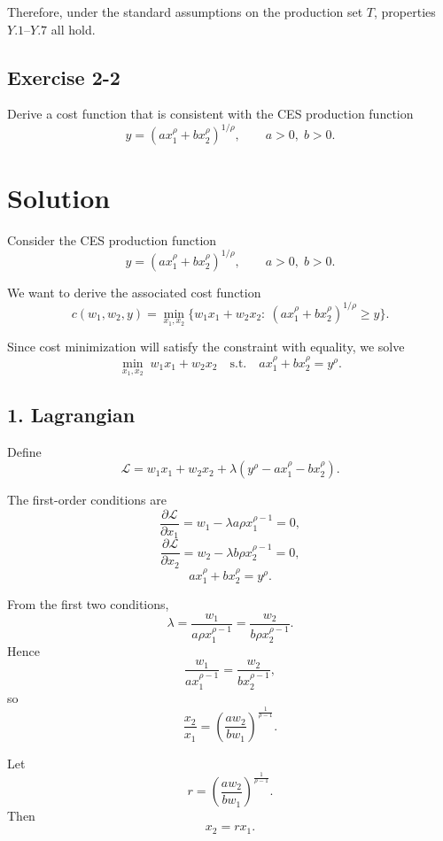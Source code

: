 Therefore, under the standard assumptions on the production set \(T\), properties \(Y.1\)--\(Y.7\) all hold.



\vspace{30pt}
\begin{tcolorbox}[breakable]

\subsection*{Exercise 2-2}

Derive a cost function that is consistent with the CES production function
\[
y = \left(a x_1^{\rho} + b x_2^{\rho}\right)^{1/\rho},
\qquad a>0,\; b>0.
\]

\end{tcolorbox}


\section*{Solution}

Consider the CES production function
\[
y=\left(a x_1^{\rho}+b x_2^{\rho}\right)^{1/\rho},
\qquad a>0,\; b>0.
\]

We want to derive the associated cost function
\[
c(w_1,w_2,y)=\min_{x_1,x_2}\{w_1x_1+w_2x_2:\ (a x_1^\rho+b x_2^\rho)^{1/\rho}\ge y\}.
\]

Since cost minimization will satisfy the constraint with equality, we solve
\[
\min_{x_1,x_2}\; w_1x_1+w_2x_2
\quad \text{s.t.} \quad
a x_1^\rho+b x_2^\rho=y^\rho.
\]

\subsection*{1. Lagrangian}

Define
\[
\mathcal L=w_1x_1+w_2x_2+\lambda\left(y^\rho-a x_1^\rho-b x_2^\rho\right).
\]

The first-order conditions are
\[
\frac{\partial \mathcal L}{\partial x_1}
=
w_1-\lambda a\rho x_1^{\rho-1}=0,
\]
\[
\frac{\partial \mathcal L}{\partial x_2}
=
w_2-\lambda b\rho x_2^{\rho-1}=0,
\]
\[
a x_1^\rho+b x_2^\rho=y^\rho.
\]

From the first two conditions,
\[
\lambda=\frac{w_1}{a\rho x_1^{\rho-1}}
=\frac{w_2}{b\rho x_2^{\rho-1}}.
\]
Hence
\[
\frac{w_1}{a x_1^{\rho-1}}=\frac{w_2}{b x_2^{\rho-1}},
\]
so
\[
\frac{x_2}{x_1}
=
\left(\frac{a w_2}{b w_1}\right)^{\frac{1}{\rho-1}}.
\]

Let
\[
r=\left(\frac{a w_2}{b w_1}\right)^{\frac{1}{\rho-1}}.
\]
Then
\[
x_2=r x_1.
\]


